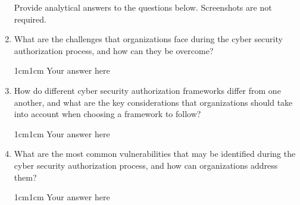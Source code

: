 \documentclass[11pt,letterpaper]{article}
\newenvironment{answer}{\em \color{blue} \begin{adjustwidth}{1cm}{1cm}}{\end{adjustwidth}}
\begin{document}
\begin{enumerate}
		\vspace{5mm}
		
		Provide analytical answers to the questions below. Screenshots are not required.
		
		\item What are the challenges that organizations face during the cyber security authorization process, and how can they be overcome?
		
		\begin{answer}
			Your answer here
		\end{answer}
		
		\item How do different cyber security authorization frameworks differ from one another, and what are the key considerations that organizations should take into account when choosing a framework to follow?
		
		\begin{answer}
			Your answer here
		\end{answer}
		
		\item What are the most common vulnerabilities that may be identified during the cyber security authorization process, and how can organizations address them?
		
		\begin{answer}
			Your answer here
		\end{answer}
		
	\end{enumerate}
	
\end{document}
